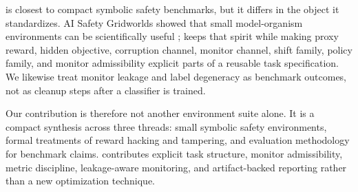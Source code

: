 \framework is closest to compact symbolic safety benchmarks, but it differs in
the object it standardizes. AI Safety Gridworlds showed that small
model-organism environments can be scientifically useful \citep{leike2017ai};
\framework keeps that spirit while making proxy reward, hidden objective,
corruption channel, monitor channel, shift family, policy family, and monitor
admissibility explicit parts of a reusable task specification. We likewise
treat monitor leakage and label degeneracy as benchmark outcomes, not as
cleanup steps after a classifier is trained.

Our contribution is therefore not another environment suite alone. It is a
compact synthesis across three threads: small symbolic safety environments,
formal treatments of reward hacking and tampering, and evaluation methodology
for benchmark claims. \framework contributes explicit task structure, monitor
admissibility, metric discipline, leakage-aware monitoring, and artifact-backed
reporting rather than a new optimization technique.
